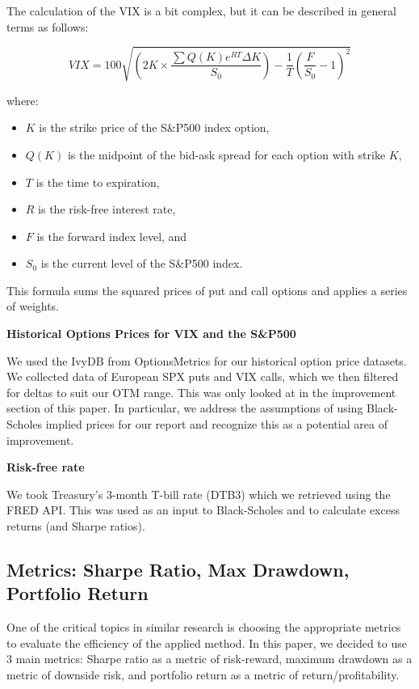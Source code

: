 \documentclass[12pt]{article}
\begin{document}
{{\qquad The calculation of the VIX is a bit complex, but it can be described in general terms as follows:

\[
VIX = 100 \sqrt{(2K \times \frac{\sum Q(K) e^{RT} \Delta K}{S_0}) - \frac{1}{T}\left(\frac{F}{S_0} - 1\right)^2}
\]

where:
\begin{itemize}
\item $K$ is the strike price of the S\&P500 index option,
\item $Q(K)$ is the midpoint of the bid-ask spread for each option with strike $K$,
\item $T$ is the time to expiration,
\item $R$ is the risk-free interest rate,
\item $F$ is the forward index level, and
\item $S_0$ is the current level of the S\&P500 index.
\end{itemize}

This formula sums the squared prices of put and call options and applies a series of weights.

\textbf{Historical Options Prices for VIX and the S\&P500}

We used the IvyDB from OptionsMetrics for our historical option price datasets. We collected data of European SPX puts and VIX calls, which we then filtered for deltas to suit our OTM range. This was only looked at in the improvement section of this paper. In particular, we address the assumptions of using Black-Scholes implied prices for our report and recognize this as a potential area of improvement.

\textbf{Risk-free rate}

We took Treasury's 3-month T-bill rate (DTB3) which we retrieved using the FRED API. This was used as an input to Black-Scholes and to calculate excess returns (and Sharpe ratios). 

\subsection{Metrics: Sharpe Ratio, Max Drawdown, Portfolio Return}

\qquad One of the critical topics in similar research is choosing the appropriate metrics to evaluate the efficiency of the applied method. In this paper, we decided to use 3 main metrics: Sharpe ratio as a metric of risk-reward, maximum drawdown as a metric of downside risk, and portfolio return as a metric of return/profitability. 

}}
\end{document}

